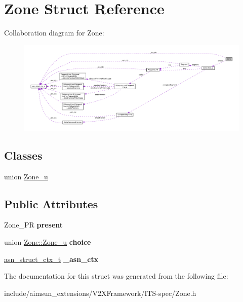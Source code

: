 \hypertarget{structZone}{}\section{Zone Struct Reference}
\label{structZone}


Collaboration diagram for Zone\+:\nopagebreak
\begin{figure}[H]
\begin{center}
\leavevmode
\includegraphics[width=350pt]{structZone__coll__graph}
\end{center}
\end{figure}
\subsection*{Classes}
\begin{DoxyCompactItemize}
\item 
union \hyperlink{unionZone_1_1Zone__u}{Zone\+\_\+u}
\end{DoxyCompactItemize}
\subsection*{Public Attributes}
\begin{DoxyCompactItemize}
\item 
Zone\+\_\+\+PR {\bfseries present}\hypertarget{structZone_a6b6baba38061bae0da50e3b97239d320}{}\label{structZone_a6b6baba38061bae0da50e3b97239d320}

\item 
union \hyperlink{unionZone_1_1Zone__u}{Zone\+::\+Zone\+\_\+u} {\bfseries choice}\hypertarget{structZone_a4cd225bfa23e1f15c8120cfda87699d1}{}\label{structZone_a4cd225bfa23e1f15c8120cfda87699d1}

\item 
\hyperlink{structasn__struct__ctx__s}{asn\+\_\+struct\+\_\+ctx\+\_\+t} {\bfseries \+\_\+asn\+\_\+ctx}\hypertarget{structZone_ab6dfc49eb357d23c78a3f11c8149a051}{}\label{structZone_ab6dfc49eb357d23c78a3f11c8149a051}

\end{DoxyCompactItemize}


The documentation for this struct was generated from the following file\+:\begin{DoxyCompactItemize}
\item 
include/aimsun\+\_\+extensions/\+V2\+X\+Framework/\+I\+T\+S-\/spec/Zone.\+h\end{DoxyCompactItemize}
